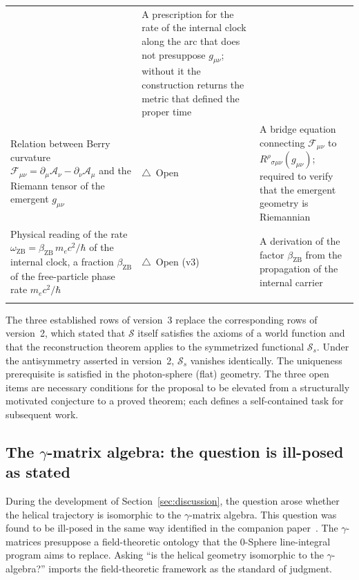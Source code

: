 \documentclass[%
 reprint, amsmath,amssymb, aps, prb, ]{revtex4-2}
\numberwithin{equation}{section}
\newcommand{\omZB}{\omega_{\text{ZB}}}
\begin{document}
\begin{table}[t!]
\begin{tabular}{p{6.2cm}p{3.2cm}p{6.6cm}}
& A prescription for the rate of the internal clock along the arc that does not presuppose $g_{\mu\nu}$; without it the construction returns the metric that defined the proper time \\
\addlinespace[0.3cm]
Relation between Berry curvature $\mathcal{F}_{\mu\nu} = \partial_\mu\mathcal{A}_\nu - \partial_\nu\mathcal{A}_\mu$ and the Riemann tensor of the emergent $g_{\mu\nu}$
& $\triangle$\ Open
& A bridge equation connecting $\mathcal{F}_{\mu\nu}$ to $R^\rho{}_{\sigma\mu\nu}(g_{\mu\nu})$; required to verify that the emergent geometry is Riemannian \\
\addlinespace[0.3cm]
Physical reading of the rate $\omZB = \beta_{\mathrm{ZB}}\,m_ec^2/\hbar$ of the internal clock, a fraction $\beta_{\mathrm{ZB}}$ of the free-particle phase rate $m_ec^2/\hbar$
& $\triangle$\ Open (v3)
& A derivation of the factor $\beta_{\mathrm{ZB}}$ from the propagation of the internal carrier \\
\addlinespace[0.2cm]
\bottomrule
\end{tabular}
\vspace{0.2cm}
\begin{minipage}{0.95\textwidth}
\justifying\footnotesize
The three established rows of version~3 replace the corresponding rows of version~2, which stated that $\mathcal{S}$ itself satisfies the axioms of a world function and that the reconstruction theorem applies to the symmetrized functional $\mathcal{S}_s$. Under the antisymmetry asserted in version~2, $\mathcal{S}_s$ vanishes identically. The uniqueness prerequisite is satisfied in the photon-sphere (flat) geometry. The three open items are necessary conditions for the proposal to be elevated from a structurally motivated conjecture to a proved theorem; each defines a self-contained task for subsequent work.
\end{minipage}
\end{table}

\subsection{The $\gamma$-matrix algebra: the question is ill-posed as stated}
\label{app:gamma_matrix}
During the development of Section~\ref{sec:discussion}, the question arose whether the helical trajectory is isomorphic to the $\gamma$-matrix algebra. This question was found to be ill-posed in the same way identified in the companion paper~\cite{hanamura50}. The $\gamma$-matrices presuppose a field-theoretic ontology that the 0-Sphere line-integral program aims to replace. Asking ``is the helical geometry isomorphic to the $\gamma$-algebra?'' imports the field-theoretic framework as the standard of judgment.
\end{document}
